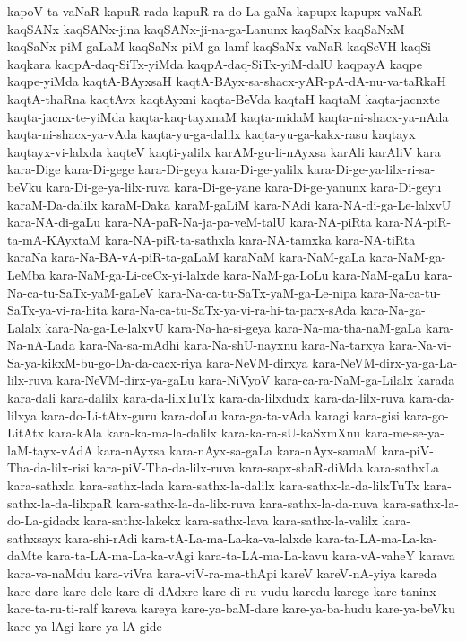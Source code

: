 {kapoV-ta-vaNaR
kapuR-rada
kapuR-ra-do-La-gaNa
kapupx
kapupx-vaNaR
kaqSANx
kaqSANx-jina
kaqSANx-ji-na-ga-Lanunx
kaqSaNx
kaqSaNxM
kaqSaNx-piM-gaLaM
kaqSaNx-piM-ga-lamf
kaqSaNx-vaNaR
kaqSeVH
kaqSi
kaqkara
kaqpA-daq-SiTx-yiMda
kaqpA-daq-SiTx-yiM-dalU
kaqpayA
kaqpe
kaqpe-yiMda
kaqtA-BAyxsaH
kaqtA-BAyx-sa-shacx-yAR-pA-dA-nu-va-taRkaH
kaqtA-thaRna
kaqtAvx
kaqtAyxni
kaqta-BeVda
kaqtaH
kaqtaM
kaqta-jacnxte
kaqta-jacnx-te-yiMda
kaqta-kaq-tayxnaM
kaqta-midaM
kaqta-ni-shacx-ya-nAda
kaqta-ni-shacx-ya-vAda
kaqta-yu-ga-dalilx
kaqta-yu-ga-kakx-rasu
kaqtayx
kaqtayx-vi-lalxda
kaqteV
kaqti-yalilx
karAM-gu-li-nAyxsa
karAli
karAliV
kara
kara-Dige
kara-Di-gege
kara-Di-geya
kara-Di-ge-yalilx
kara-Di-ge-ya-lilx-ri-sa-beVku
kara-Di-ge-ya-lilx-ruva
kara-Di-ge-yane
kara-Di-ge-yanunx
kara-Di-geyu
karaM-Da-dalilx
karaM-Daka
karaM-gaLiM
kara-NAdi
kara-NA-di-ga-Le-lalxvU
kara-NA-di-gaLu
kara-NA-paR-Na-ja-pa-veM-talU
kara-NA-piRta
kara-NA-piR-ta-mA-KAyxtaM
kara-NA-piR-ta-sathxla
kara-NA-tamxka
kara-NA-tiRta
karaNa
kara-Na-BA-vA-piR-ta-gaLaM
karaNaM
kara-NaM-gaLa
kara-NaM-ga-LeMba
kara-NaM-ga-Li-ceCx-yi-lalxde
kara-NaM-ga-LoLu
kara-NaM-gaLu
kara-Na-ca-tu-SaTx-yaM-gaLeV
kara-Na-ca-tu-SaTx-yaM-ga-Le-nipa
kara-Na-ca-tu-SaTx-ya-vi-ra-hita
kara-Na-ca-tu-SaTx-ya-vi-ra-hi-ta-parx-sAda
kara-Na-ga-Lalalx
kara-Na-ga-Le-lalxvU
kara-Na-ha-si-geya
kara-Na-ma-tha-naM-gaLa
kara-Na-nA-Lada
kara-Na-sa-mAdhi
kara-Na-shU-nayxnu
kara-Na-tarxya
kara-Na-vi-Sa-ya-kikxM-bu-go-Da-da-cacx-riya
kara-NeVM-dirxya
kara-NeVM-dirx-ya-ga-La-lilx-ruva
kara-NeVM-dirx-ya-gaLu
kara-NiVyoV
kara-ca-ra-NaM-ga-Lilalx
karada
kara-dali
kara-dalilx
kara-da-lilxTuTx
kara-da-lilxdudx
kara-da-lilx-ruva
kara-da-lilxya
kara-do-Li-tAtx-guru
kara-doLu
kara-ga-ta-vAda
karagi
kara-gisi
kara-go-LitAtx
kara-kAla
kara-ka-ma-la-dalilx
kara-ka-ra-sU-kaSxmXnu
kara-me-se-ya-laM-tayx-vAdA
kara-nAyxsa
kara-nAyx-sa-gaLa
kara-nAyx-samaM
kara-piV-Tha-da-lilx-risi
kara-piV-Tha-da-lilx-ruva
kara-sapx-shaR-diMda
kara-sathxLa
kara-sathxla
kara-sathx-lada
kara-sathx-la-dalilx
kara-sathx-la-da-lilxTuTx
kara-sathx-la-da-lilxpaR
kara-sathx-la-da-lilx-ruva
kara-sathx-la-da-nuva
kara-sathx-la-do-La-gidadx
kara-sathx-lakekx
kara-sathx-lava
kara-sathx-la-valilx
kara-sathxsayx
kara-shi-rAdi
kara-tA-La-ma-La-ka-va-lalxde
kara-ta-LA-ma-La-ka-daMte
kara-ta-LA-ma-La-ka-vAgi
kara-ta-LA-ma-La-kavu
kara-vA-vaheY
karava
kara-va-naMdu
kara-viVra
kara-viV-ra-ma-thApi
kareV
kareV-nA-yiya
kareda
kare-dare
kare-dele
kare-di-dAdxre
kare-di-ru-vudu
karedu
karege
kare-taninx
kare-ta-ru-ti-ralf
kareva
kareya
kare-ya-baM-dare
kare-ya-ba-hudu
kare-ya-beVku
kare-ya-lAgi
kare-ya-lA-gide
}
